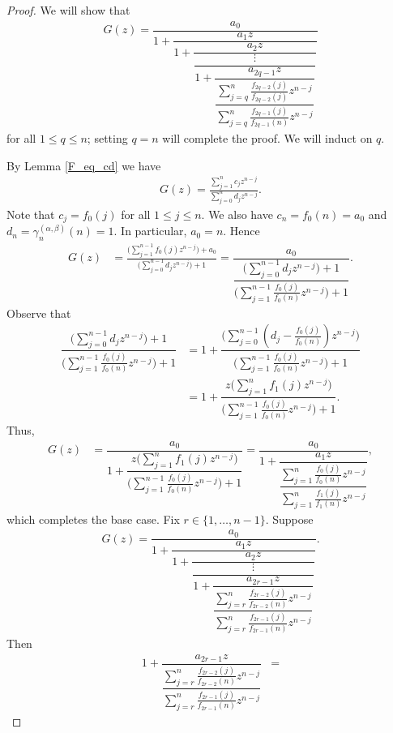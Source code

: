 \documentclass[10pt,a4paper]{amsart}
\begin{document}
\begin{proof}
We will show that 
\begin{align*}
G(z)=\dfrac{a_0}{1+\dfrac{a_1z}{1+\dfrac{a_2z}{\dfrac{\vdots}{1+\dfrac{a_{2q-1}z}{\dfrac{\sum_{j=q}^n\frac{f_{2q-2}(j)}{f_{2q-2}(j)}z^{n-j}}{\sum_{j=q}^n\frac{f_{2q-1}(j)}{f_{2q-1}(n)}z^{n-j}}}}}}}
\end{align*}
for all $1\le q\le n$; setting $q=n$ will complete the proof. We will induct on $q$. 



By Lemma \ref{F_eq_cd} we have
\begin{align*}
    G(z)=\frac{\sum_{j=1}^{n}c_jz^{n-j}}{\sum_{j=0}^nd_jz^{n-j}}.
\end{align*}
Note that $c_j=f_0(j)$ for all $1\le j\le n$. We also have $c_n=f_0(n)=a_0$ and $d_n=\gamma_n^{(\alpha,\beta)}(n)=1$. In particular, $a_0 = n$. Hence
\begin{align*}
    G(z)&=\frac{\bigg(\sum_{j=1}^{n-1}f_0(j)z^{n-j}\bigg)+a_0}{\bigg(\sum_{j=0}^{n-1}d_jz^{n-j}\bigg)+1} =\dfrac{a_0}{\dfrac{\bigg(\sum_{j=0}^{n-1}d_jz^{n-j}\bigg)+1}{\bigg(\sum_{j=1}^{n-1}\frac{f_0(j)}{f_0(n)}z^{n-j}\bigg)+1}}.
\end{align*}
Observe that 
\begin{align*}
{\dfrac{\bigg(\sum_{j=0}^{n-1}d_jz^{n-j}\bigg)+1}{\bigg(\sum_{j=1}^{n-1}\frac{f_0(j)}{f_0(n)}z^{n-j}\bigg)+1}} &= {1+\dfrac{\bigg(\sum_{j=0}^{n-1}(d_j-\frac{f_0(j)}{f_0(n)})z^{n-j}\bigg)}{\bigg(\sum_{j=1}^{n-1}\frac{f_0(j)}{f_0(n)}z^{n-j}\bigg)+1}} \\
&={1+\dfrac{z\bigg(\sum_{j=1}^nf_1(j)z^{n-j}\bigg)}{\bigg(\sum_{j=1}^{n-1}\frac{f_0(j)}{f_0(n)}z^{n-j}\bigg)+1}}.
\end{align*}
Thus,
\begin{align*}    
     G(z)&=\dfrac{a_0}{1+\dfrac{z\bigg(\sum_{j=1}^nf_1(j)z^{n-j}\bigg)}{\bigg(\sum_{j=1}^{n-1}\frac{f_0(j)}{f_0(n)}z^{n-j}\bigg)+1}}
    =\dfrac{a_0}{1+\dfrac{a_1z}{\dfrac{\sum_{j=1}^n\frac{f_0(j)}{f_0(n)}z^{n-j}}{\sum_{j=1}^n\frac{f_1(j)}{f_1(n)}z^{n-j}}}},
\end{align*}
which completes the base case. Fix $r\in\{1,\ldots,n-1\}$. Suppose 
\begin{align*}
G(z)=\dfrac{a_0}{1+\dfrac{a_1z}{1+\dfrac{a_2z}{\dfrac{\vdots}{1+\dfrac{a_{2r-1}z}{\dfrac{\sum_{j=r}^n\frac{f_{2r-2}(j)}{f_{2r-2}(n)}z^{n-j}}{\sum_{j=r}^n\frac{f_{2r-1}(j)}{f_{2r-1}(n)}z^{n-j}}}}}}}.
\end{align*}
Then
\begin{align*}
{1+\dfrac{a_{2r-1}z}{\dfrac{\sum_{j=r}^n\frac{f_{2r-2}(j)}{f_{2r-2}(n)}z^{n-j}}{\sum_{j=r}^n\frac{f_{2r-1}(j)}{f_{2r-1}(n)}z^{n-j}}}} &=

\end{align*}
\end{proof}
\end{document}
